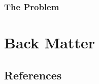 \documentclass[
  letterpaper,
]{book}
\newlength{\cslhangindent}
\newlength{\cslentryspacingunit} %
\newenvironment{CSLReferences}[2] %
 {%
  \setlength{\parindent}{0pt}
  \ifodd #1
  \let\oldpar\par
  \def\par{\hangindent=\cslhangindent\oldpar}
  \fi
  \setlength{\parskip}{#2\cslentryspacingunit}
 }%
 {}
\begin{document}
\hypertarget{the-problem-1}{%
\section{The Problem}\label{the-problem-1}}

\part{Back Matter}

\hypertarget{references}{%
\chapter*{References}\label{references}}


\hypertarget{refs}{}
\begin{CSLReferences}{0}{0}
\end{CSLReferences}


\backmatter
\end{document}
